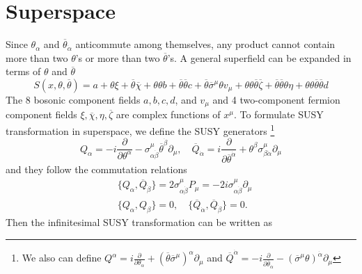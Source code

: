 \documentclass[12pt]{report}
\begin{document}
\section{Superspace}
Since $\theta_{\alpha}$ and $\overline{\theta}_{\dot{\alpha}}$ anticommute among themselves, any product cannot contain more than two $\theta$'s or more than two $\overline{\theta}$'s.
A general superfield can be expanded in terms of $\theta$ and $\overline{\theta}$
\begin{equation}
S(x, \theta, \overline{\theta}) = a + \theta \xi + \overline{\theta} \overline{\chi} + \theta \theta b + \overline{\theta} \overline{\theta} c + \overline{\theta} \overline{\sigma}^{\mu} \theta v_{\mu} + \theta \theta \overline{\theta} \overline{\zeta} + \overline{\theta} \overline{\theta} \theta \eta + \theta \theta \overline{\theta} \overline{\theta} d
\end{equation}
The 8 bosonic component fields $a, b, c, d$, and $v_{\mu}$ and 4 two-component fermion component fields $\xi, \overline{\chi}, \eta, \overline{\zeta}$ are complex functions of $x^{\mu}$.
To formulate SUSY transformation in superspace, we define the SUSY generators 
\footnote{We also can define 
$Q^{\alpha} = i \frac{\partial}{\partial \theta_{\alpha}} + (\overline{\theta} \overline{\sigma}^{\mu})^{\alpha} \partial_{\mu}$ and 
$\overline{Q}^{\dot{\alpha}} = -i \frac{\partial}{\partial \overline{\theta}_{\dot{\alpha}}} - (\overline{\sigma}^{\mu} \theta)^{\dot{\alpha}} \partial_{\mu}$}
\begin{equation}
Q_{\alpha} = -i \frac{\partial}{\partial \theta^{\alpha}} - \sigma^{\mu}_{\alpha \dot{\beta}} \overline{\theta}^{\dot{\beta}} \partial_{\mu}, \quad 
\overline{Q}_{\dot{\alpha}} = i \frac{\partial}{\partial \overline{\theta}^{\dot{\alpha}}} + \theta^{\beta} \sigma^{\mu}_{\beta \dot{\alpha}} \partial_{\mu}
\end{equation}
and they follow the commutation relations
\begin{align}
& \{Q_{\alpha}, \overline{Q}_{\dot{\beta}}\} = 2 \sigma^{\mu}_{\alpha \dot{\beta}} P_{\mu} = -2i \sigma^{\mu}_{\alpha \dot{\beta}} \partial_{\mu} \\
& \{Q_{\alpha}, Q_{\beta}\} = 0, \quad 
\{\overline{Q}_{\dot{\alpha}}, \overline{Q}_{\dot{\beta}}\} = 0 .
\end{align}
Then the infinitesimal SUSY transformation can be written as
\end{document}
